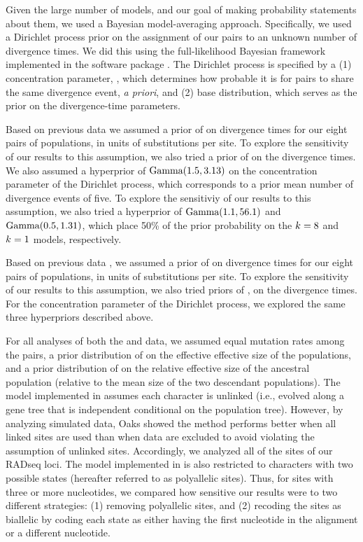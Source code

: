 Given the large number of models, and our goal of making probability statements
about them, we used a Bayesian model-averaging approach.
Specifically, we used a Dirichlet process prior on the assignment of our
pairs to an unknown number of divergence times.
We did this using the full-likelihood Bayesian framework implemented in the
software package \ecoevolity \citep{Oaks2018ecoevolity}.
The Dirichlet process is specified by a
(1) concentration parameter, \concentration, which determines how probable it
is for pairs to share the same divergence event, \emph{a priori}, and
(2) base distribution, which serves as the prior on the divergence-time
parameters.

Based on previous data \citep{Welton2010, Welton2010zootaxa, Siler2010} we
assumed a prior of  on divergence times for our eight pairs
of  populations, in units of substitutions per site.
To explore the sensitivity of our results to this assumption, we also
tried a prior of  on the divergence times.
We also assumed a hyperprior of $\textrm{Gamma}(1.5, 3.13)$ on the concentration
parameter of the Dirichlet process, which corresponds to a prior mean number of
divergence events of five.
To explore the sensitiviy of our results to this assumption, we also
tried a hyperprior of
$\textrm{Gamma}(1.1, 56.1)$
and
$\textrm{Gamma}(0.5, 1.31)$,
which place 50\% of the prior probability on the
$k_{} = 8$
and
$k_{} = 1$
models, respectively.

Based on previous data \citep{Siler2012, Siler2014kikuchii}, we assumed a prior
of  on divergence times for our eight pairs of 
populations, in units of substitutions per site.
To explore the sensitivity of our results to this assumption, we also tried
priors of ,  on the 
divergence times.
For the concentration parameter of the Dirichlet process, we explored the same
three hyperpriors described above.

For all analyses of both the  and  data, we
assumed equal mutation rates among the pairs, a prior distribution of
 on the effective effective size of the populations, and a
prior distribution of  on the relative effective size of the
ancestral population (relative to the mean size of the two descendant
populations).
The model implemented in \ecoevolity assumes each character is unlinked (i.e.,
evolved along a gene tree that is independent conditional on the population
tree).
However, by analyzing simulated data, Oaks \citeyear{Oaks2018ecoevolity} showed
the method performs better when all linked sites are used than when data are
excluded to avoid violating the assumption of unlinked sites.
Accordingly, we analyzed all of the sites of our RADseq loci.
The model implemented in \ecoevolity is also restricted to characters with two
possible states (hereafter referred to as polyallelic sites).
Thus, for sites with three or more nucleotides, we compared how sensitive our results were to two different strategies:
(1) removing polyallelic sites, and
(2) recoding the sites as biallelic by coding each state as either having the
first nucleotide in the alignment or a different nucleotide.

